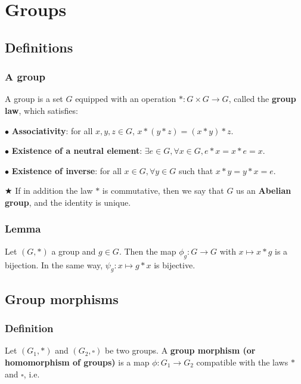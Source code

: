 \section{Groups}
		\subsection{Definitions}
			\subsubsection{A group}
    			A group is a set $G$ equipped with an operation $\ast: G\times G \rightarrow G$, called the \textbf{group law}, which satisfies:
    			
    			$\bullet$ \textbf{Associativity}: for all $x,y,z \in G$, $x\ast(y\ast z) = (x\ast y)\ast z$.
       
                $\bullet$ \textbf{Existence of a neutral element}: $\exists e \in G, \forall x \in G, e \ast x = x \ast e = x$.
                
                $\bullet$ \textbf{Existence of inverse}: for all $x \in G, \forall y \in G$ such that $x \ast y = y \ast x = e$.

                \vspace{5pt}
                
                $\bigstar$ If in addition the law $\ast$ is commutative, then we say that $G$ us an \textbf{Abelian group}, and the identity is unique.
                
			\subsubsection{Lemma}
            Let $(G, \ast)$ a group and $g \in G$. Then the map $\phi_g: G \rightarrow G$ with $x \mapsto x \ast g$ is a bijection. In the same way, $\psi_g: x \mapsto g \ast x$ is bijective.

        \subsection{Group morphisms}
            \subsubsection{Definition}
                Let $(G_1, \ast)$ and $(G_2, \square)$ be two groups. A \textbf{group morphism (or homomorphism of groups)} is a map $\phi : G_1 \rightarrow G_2$ compatible with the laws $\ast$ and $\square$, i.e.
                
